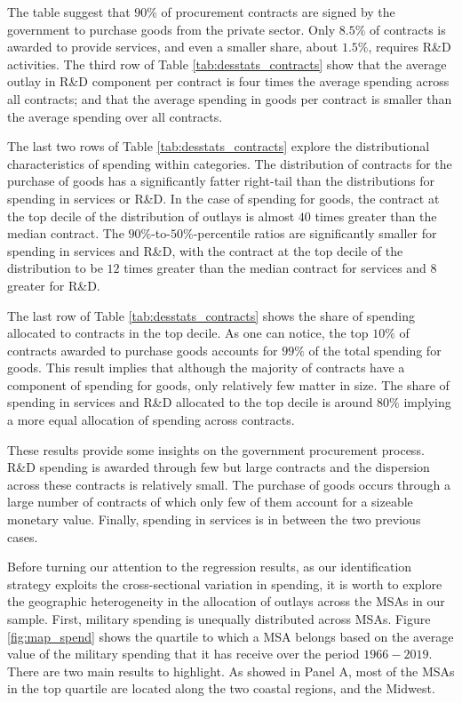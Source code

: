 \documentclass[dv_diss_main.tex]{subfiles}
\begin{document}
The table suggest that $90\%$ of procurement contracts are signed by the government to purchase goods from the private sector. Only $8.5\%$ of contracts is awarded to provide services, and even a smaller share, about $1.5\%$, requires R\&D activities. The third row of Table \ref{tab:desstats_contracts} show that the average outlay in R\&D component per contract is four times the average spending across all contracts; and that the average spending in goods per contract is smaller than the average spending over all contracts. 

The last two rows of Table \ref{tab:desstats_contracts} explore the distributional characteristics of spending within categories. The distribution of contracts for the purchase of goods has a significantly fatter right-tail than the distributions for spending in services or R\&D. In the case of spending for goods, the contract at the top decile of the distribution of outlays is almost $40$ times greater than the median contract. The $90\%$-to-$50\%$-percentile ratios are significantly smaller for spending in services and R\&D, with the contract at the top decile of the distribution to be $12$ times greater than the median contract for services and $8$ greater for R\&D. 

The last row of Table \ref{tab:desstats_contracts} shows the share of spending allocated to contracts in the top decile. As one can notice, the top $10\%$ of contracts awarded to purchase goods accounts for $99\%$ of the total spending for goods. This result implies that although the majority of contracts have a component of spending for goods, only relatively few matter in size. The share of spending in services and R\&D allocated to the top decile is around $80\%$ implying a more equal allocation of spending across contracts.  

These results provide some insights on the government procurement process. R\&D spending is awarded through few but large contracts and the dispersion across these contracts is relatively small. The purchase of goods occurs through a large number of contracts of which only few of them account for a sizeable monetary value. Finally, spending in services is in between the two previous cases.

Before turning our attention to the regression results, as our identification strategy exploits the cross-sectional variation in spending, it is worth to explore the geographic heterogeneity in the allocation of outlays across the MSAs in our sample. First, military spending is unequally distributed across MSAs. Figure \ref{fig:map_spend} shows the quartile to which a MSA belongs based on the average value of the military spending that it has receive over the period $1966-2019$. There are two main results to highlight. As showed in Panel A, most of the MSAs in the top quartile are located along the two coastal regions, and the Midwest. 
\end{document}

